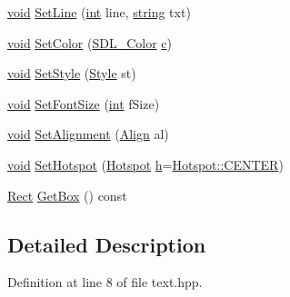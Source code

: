 \begin{DoxyCompactItemize}
\item 
\hyperlink{_s_d_l__opengles2__gl2ext_8h_ae5d8fa23ad07c48bb609509eae494c95}{void} \hyperlink{class_text_a979111d4dc7b543216d292bb987121e4}{Set\-Line} (\hyperlink{_s_d_l__thread_8h_a6a64f9be4433e4de6e2f2f548cf3c08e}{int} line, \hyperlink{_s_d_l__opengl__glext_8h_ae84541b4f3d8e1ea24ec0f466a8c568b}{string} txt)
\item 
\hyperlink{_s_d_l__opengles2__gl2ext_8h_ae5d8fa23ad07c48bb609509eae494c95}{void} \hyperlink{class_text_a37d65f0d089fe45dea05073e974ad175}{Set\-Color} (\hyperlink{struct_s_d_l___color}{S\-D\-L\-\_\-\-Color} \hyperlink{_s_d_l__opengl__glext_8h_a1f2d7f8147412c43ba2303a56f97ee73}{c})
\item 
\hyperlink{_s_d_l__opengles2__gl2ext_8h_ae5d8fa23ad07c48bb609509eae494c95}{void} \hyperlink{class_text_a8483a29f1f37bbe4e3237827bf4ea69f}{Set\-Style} (\hyperlink{class_text_ac82ae440952fc1c8e10a16f81a593ce1}{Style} st)
\item 
\hyperlink{_s_d_l__opengles2__gl2ext_8h_ae5d8fa23ad07c48bb609509eae494c95}{void} \hyperlink{class_text_a8f773d76ae3e4806e8448e7800e2c002}{Set\-Font\-Size} (\hyperlink{_s_d_l__thread_8h_a6a64f9be4433e4de6e2f2f548cf3c08e}{int} f\-Size)
\item 
\hyperlink{_s_d_l__opengles2__gl2ext_8h_ae5d8fa23ad07c48bb609509eae494c95}{void} \hyperlink{class_text_ac13e9efff6c580fca0dd1385fc754f71}{Set\-Alignment} (\hyperlink{class_text_a93b1e85f0f6745446ed27cd708289339}{Align} al)
\item 
\hyperlink{_s_d_l__opengles2__gl2ext_8h_ae5d8fa23ad07c48bb609509eae494c95}{void} \hyperlink{class_text_a566507adcc38cc048c8603870197b878}{Set\-Hotspot} (\hyperlink{common_8hpp_aaa588ba8f99807e02a59c99df80af509}{Hotspot} \hyperlink{_s_d_l__opengl__glext_8h_afa0fb1b5e976920c0abeff2dca3ed774}{h}=\hyperlink{common_8hpp_aaa588ba8f99807e02a59c99df80af509a2159ffbd3a68037511ab5ab4dd35ace7}{Hotspot\-::\-C\-E\-N\-T\-E\-R})
\item 
\hyperlink{class_rect}{Rect} \hyperlink{class_text_a105371980812219e643b07a4460d6940}{Get\-Box} () const 
\end{DoxyCompactItemize}


\subsection{Detailed Description}


Definition at line 8 of file text.\-hpp.



